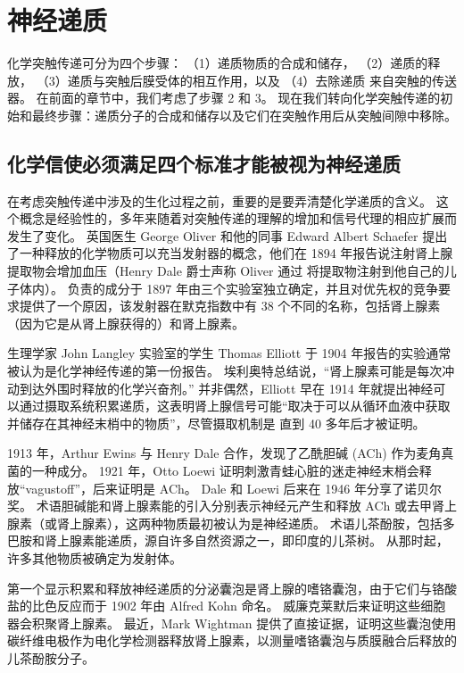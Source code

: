 \chapter{神经递质} \label{chap:chap16}
化学突触传递可分为四个步骤：
（1）递质物质的合成和储存，
（2）递质的释放，
（3）递质与突触后膜受体的相互作用，以及
（4）去除递质 来自突触的传送器。 
在前面的章节中，我们考虑了步骤 2 和 3。
现在我们转向化学突触传递的初始和最终步骤：递质分子的合成和储存以及它们在突触作用后从突触间隙中移除。



\section{化学信使必须满足四个标准才能被视为神经递质}

在考虑突触传递中涉及的生化过程之前，重要的是要弄清楚化学递质的含义。 
这个概念是经验性的，多年来随着对突触传递的理解的增加和信号代理的相应扩展而发生了变化。 
英国医生 George Oliver 和他的同事 Edward Albert Schaefer 提出了一种释放的化学物质可以充当发射器的概念，他们在 1894 年报告说注射肾上腺提取物会增加血压（Henry Dale 爵士声称 Oliver 通过 将提取物注射到他自己的儿子体内）。 
负责的成分于 1897 年由三个实验室独立确定，并且对优先权的竞争要求提供了一个原因，该发射器在默克指数中有 38 个不同的名称，包括肾上腺素（因为它是从肾上腺获得的）和肾上腺素。


生理学家 John Langley 实验室的学生 Thomas Elliott 于 1904 年报告的实验通常被认为是化学神经传递的第一份报告。 
埃利奥特总结说，“肾上腺素可能是每次冲动到达外围时释放的化学兴奋剂。” 
并非偶然，Elliott 早在 1914 年就提出神经可以通过摄取系统积累递质，这表明肾上腺信号可能“取决于可以从循环血液中获取并储存在其神经末梢中的物质”，尽管摄取机制是 直到 40 多年后才被证明。


1913 年，Arthur Ewins 与 Henry Dale 合作，发现了乙酰胆碱 (ACh) 作为麦角真菌的一种成分。 
1921 年，Otto Loewi 证明刺激青蛙心脏的迷走神经末梢会释放“vagustoff”，后来证明是 ACh。 
Dale 和 Loewi 后来在 1946 年分享了诺贝尔奖。
术语胆碱能和肾上腺素能的引入分别表示神经元产生和释放 ACh 或去甲肾上腺素（或肾上腺素），这两种物质最初被认为是神经递质。 
术语儿茶酚胺，包括多巴胺和肾上腺素能递质，源自许多自然资源之一，即印度的儿茶树。 
从那时起，许多其他物质被确定为发射体。


第一个显示积累和释放神经递质的分泌囊泡是肾上腺的嗜铬囊泡，由于它们与铬酸盐的比色反应而于 1902 年由 Alfred Kohn 命名。 
威廉克莱默后来证明这些细胞器会积聚肾上腺素。 
最近，Mark Wightman 提供了直接证据，证明这些囊泡使用碳纤维电极作为电化学检测器释放肾上腺素，以测量嗜铬囊泡与质膜融合后释放的儿茶酚胺分子。


